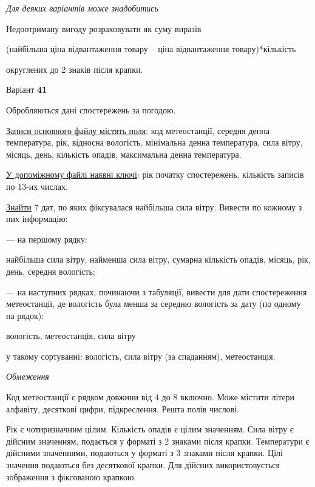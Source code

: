 \documentclass[11pt, ukrainian]{article}
\begin{document}
\bigskip\textit{Для деяких варіантів може знадобитись}

Недоотриману вигоду розраховувати як суму виразів
{\center (найбільша ціна відвантаження товару – ціна відвантаження товару)*кількість\par}

\bigskip
{\noindent} округлених до 2 знаків після крапки.




\par
\newpage
{\center Варіант  \No \textbf { 41 }\par}
\bigskip
Обробляються дані спостережень за погодою. 

\underline{Записи основного файлу містять поля}: код метеостанції, середня денна температура, рік, відносна вологість, мінімальна денна температура, сила вітру, місяць, день, кількість опадів, максимальна денна температура.

\underline{У допоміжному файлі наявні ключі}: рік початку спостережень, кількість записів по 13-их числах.

\underline{Знайти} 7 дат, по яких фіксувалася найбільша сила вітру. Вивести по кожному з них інформацію:\par
{\noindent}--- на першому рядку:\par
найбільша сила вітру, найменша сила вітру, сумарна кількість опадів, місяць, рік, день, середня вологість;

{\noindent}--- на наступних рядках, починаючи з табуляції, вивести для дати спостереження метеостанції, де вологість була менша за середню вологість за дату (по одному на рядок):\par
вологість, метеостанція, сила вітру

{\noindent}у такому сортуванні: вологість, сила вітру (за спаданням), метеостанція.


\bigskip\textit{Обмеження}

Код метеостанції є рядком довжини від 4 до 8 включно.
Може містити літери алфавіту, десяткові цифри, підкреслення. Решта полів числові.

Рік є чотиризначним цілим.
Кількість опадів є цілим значенням.
Сила вітру є дійсним значенням, подається у форматі з 2 знаками після крапки.
Температури є дійсними значеннями, подаються у форматі з 3 знаками після крапки.
Цілі значення подаються без десяткової крапки.
Для дійсних використовується зображення з фіксованою крапкою.
\end{document}
